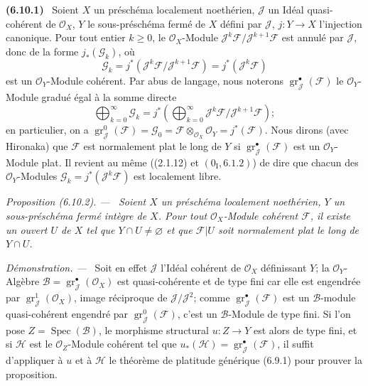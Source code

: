 \documentclass[10pt,oneside]{book}
\makeatletter
\newenvironment{env}[1][]{\par\medskip\noindent\textbf{(#1)}\ }{\par}
\newenvironment{proposition}[1][]{%
  \par\medskip\noindent\itshape Proposition (#1). ---\ }{\par}
\newenvironment{proof}{%
  \par\medskip\noindent\textit{Démonstration. ---\ }}{\par}
\newcommand{\EGAReaderTarget}[2]{\hypertarget{#1}{}\@bsphack\begingroup\def\@currentHref{#1}\label{#2}\endgroup\@esphack}
\makeatother
\begin{document}
\begin{env}[6.10.1]
\EGAReaderTarget{ega4.c04.statement.6-10-1}{IV.2.s6.10.1-fr}
Soient $X$ un préschéma localement noethérien, $\mathcal J$ un Idéal
quasi-cohérent de $\mathcal O_X$, $Y$ le sous-préschéma fermé de $X$ défini
par $\mathcal J$, $j:Y\to X$ l'injection canonique. Pour tout entier $k\geq0$,
le $\mathcal O_X$-Module
$\mathcal J^k\mathcal F/\mathcal J^{k+1}\mathcal F$ est annulé par
$\mathcal J$, donc de la forme $j_*(\mathcal G_k)$, où
\[
\mathcal G_k=j^*(\mathcal J^k\mathcal F/\mathcal J^{k+1}\mathcal F)
=j^*(\mathcal J^k\mathcal F)
\]
est un $\mathcal O_Y$-Module cohérent. Par abus de langage, nous noterons
$\operatorname{gr}_{\mathcal J}^{\bullet}(\mathcal F)$ le
$\mathcal O_Y$-Module gradué égal à la somme directe
\[
\bigoplus_{k=0}^{\infty}\mathcal G_k
=j^*\left(\bigoplus_{k=0}^{\infty}
\mathcal J^k\mathcal F/\mathcal J^{k+1}\mathcal F\right);
\]
en particulier, on a
$\operatorname{gr}_{\mathcal J}^{0}(\mathcal F)=\mathcal G_0
=\mathcal F\otimes_{\mathcal O_X}\mathcal O_Y=j^*(\mathcal F)$. Nous dirons
(avec Hironaka) que $\mathcal F$ est normalement plat le long de $Y$ si
$\operatorname{gr}_{\mathcal J}^{\bullet}(\mathcal F)$ est un
$\mathcal O_Y$-Module plat. Il revient au même ((2.1.12) et
$(0_{\mathrm I},6.1.2)$) de dire que chacun des $\mathcal O_Y$-Modules
$\mathcal G_k=j^*(\mathcal J^k\mathcal F)$ est localement libre.
\end{env}

\begin{proposition}[6.10.2]
\label{IV.2.s6.10.2-fr}
Soient $X$ un préschéma localement noethérien, $Y$ un sous-préschéma fermé
intègre de $X$. Pour tout $\mathcal O_X$-Module cohérent $\mathcal F$, il
existe un ouvert $U$ de $X$ tel que $Y\cap U\ne\varnothing$ et que
$\mathcal F|U$ soit normalement plat le long de $Y\cap U$.
\end{proposition}

\begin{proof}
Soit en effet $\mathcal J$ l'Idéal cohérent de $\mathcal O_X$ définissant
$Y$; la $\mathcal O_Y$-Algèbre
$\mathcal B=\operatorname{gr}_{\mathcal J}^{\bullet}(\mathcal O_X)$ est
quasi-cohérente et de type fini car elle est engendrée par
$\operatorname{gr}_{\mathcal J}^{1}(\mathcal O_X)$, image réciproque de
$\mathcal J/\mathcal J^2$; comme
$\operatorname{gr}_{\mathcal J}^{\bullet}(\mathcal F)$ est un
$\mathcal B$-module quasi-cohérent engendré par
$\operatorname{gr}_{\mathcal J}^{0}(\mathcal F)$, c'est un
$\mathcal B$-Module de type fini. Si l'on pose
$Z=\operatorname{Spec}(\mathcal B)$, le morphisme structural $u:Z\to Y$ est
alors de type fini, et si $\mathcal H$ est le $\mathcal O_Z$-Module cohérent
tel que $u_*(\mathcal H)=\operatorname{gr}_{\mathcal J}^{\bullet}(\mathcal F)$,
il suffit d'appliquer à $u$ et à $\mathcal H$ le théorème de platitude
générique (6.9.1) pour prouver la proposition.
\end{proof}
\end{document}
